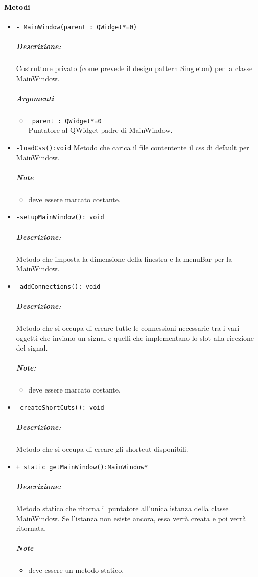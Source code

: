 \paragraph{\textcolor{black}{Metodi\\}}
\begin{itemize}
\item \color{blue}\verb!- MainWindow(parent : QWidget*=0)!
\color{black}
\subparagraph{Descrizione: }Costruttore privato (come prevede il design pattern\g{} Singleton) per la classe MainWindow. \\
\subparagraph{Argomenti}
\begin{itemize}
\item \color{RoyalPurple} \verb! parent : QWidget*=0 !\\ Puntatore al QWidget padre di MainWindow.
\end{itemize}
\item \color{blue}\verb!-loadCss():void!
\color{black} Metodo che carica il file contentente il css di default per MainWindow. \\
\subparagraph{Note}
 \begin{itemize}
 \item deve essere marcato costante.
 \end{itemize}

\item \color{blue}\verb!-setupMainWindow(): void !
\color{black}
\subparagraph{Descrizione:} Metodo che imposta la dimensione della finestra e la menuBar per la MainWindow.
 
\item \color{blue}\verb!-addConnections(): void!
\color{black} 
\subparagraph{Descrizione: }Metodo che si occupa di creare tutte le connessioni necessarie tra i vari oggetti che inviano un signal\g{} e quelli che implementano lo slot\g{} alla ricezione del signal\g{}.
 \subparagraph{Note:}
 \begin{itemize}
 \item deve essere marcato costante.
 \end{itemize}

\item \color{blue}\verb!-createShortCuts(): void!
\color{black} 
\subparagraph{Descrizione: }Metodo che si occupa di creare gli shortcut disponibili.

\item \color{blue}\verb!+ static getMainWindow():MainWindow* !
\color{black}
\subparagraph{Descrizione:} Metodo statico che ritorna il puntatore all'unica istanza della classe MainWindow. Se l'istanza non esiste ancora, essa verrà creata e poi verrà ritornata. \\
\subparagraph{Note}
\begin{itemize}
\item deve essere un metodo statico.
\end{itemize}


\end{itemize}
